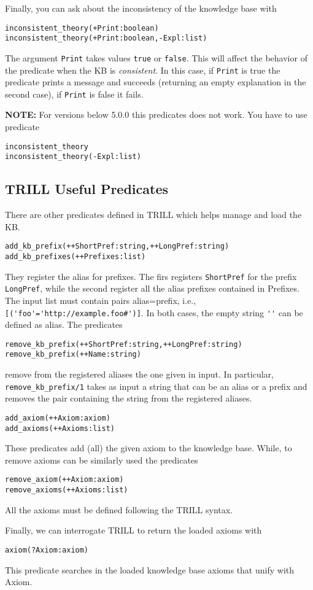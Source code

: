 Finally, you can ask about the inconsistency of the knowledge base with
\begin{verbatim}
inconsistent_theory(+Print:boolean)
inconsistent_theory(+Print:boolean,-Expl:list)
\end{verbatim}
The argument \verb|Print| takes values \verb|true| or \verb|false|. This will affect the behavior of the predicate when the KB is \emph{consistent}. In this case, if \verb|Print| is true the predicate prints a message and succeeds (returning an empty explanation in the second case), if \verb|Print| is false it fails.

\noindent
\textbf{NOTE:} For versions below 5.0.0 this predicates does not work. You have to use predicate 
\begin{verbatim}
inconsistent_theory
inconsistent_theory(-Expl:list)
\end{verbatim}

\subsection{TRILL Useful Predicates}
There are other predicates defined in TRILL which helps manage and load the KB.
\begin{verbatim}
add_kb_prefix(++ShortPref:string,++LongPref:string)
add_kb_prefixes(++Prefixes:list)
\end{verbatim}
They register the alias for prefixes. The firs registers \verb|ShortPref| for the prefix \verb|LongPref|, while the second register all the alias prefixes contained in Prefixes. The input list must contain pairs alias=prefix, i.e., \verb|[('foo'='http://example.foo#')]|. In both cases, the empty string \verb|''| can be defined as alias. The predicates
\begin{verbatim}
remove_kb_prefix(++ShortPref:string,++LongPref:string)
remove_kb_prefix(++Name:string)
\end{verbatim}
remove from the registered aliases the one given in input. In particular, \verb|remove_kb_prefix/1| takes as input a string that can be an alias or a prefix and removes the pair containing the string from the registered aliases.

\begin{verbatim}
add_axiom(++Axiom:axiom)
add_axioms(++Axioms:list)
\end{verbatim}
These predicates add (all) the given axiom to the knowledge base. While, to remove axioms can be similarly used the predicates
\begin{verbatim}
remove_axiom(++Axiom:axiom)
remove_axioms(++Axioms:list)
\end{verbatim}
All the axioms must be defined following the TRILL syntax.

Finally, we can interrogate TRILL to return the loaded axioms with
\begin{verbatim}
axiom(?Axiom:axiom)
\end{verbatim}
This predicate searches in the loaded knowledge base axioms that unify with Axiom.
